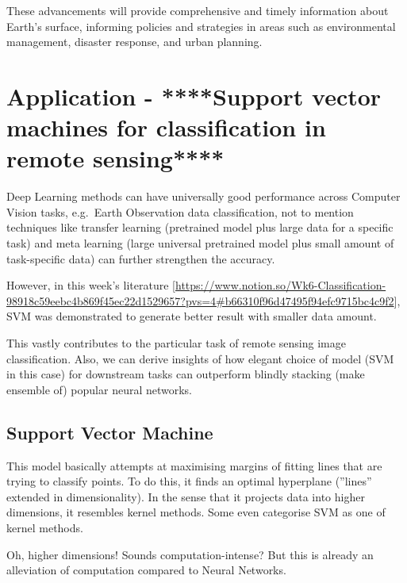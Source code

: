 \documentclass[
  letterpaper,
  DIV=11,
  numbers=noendperiod]{scrreprt}
\begin{document}
These advancements will provide comprehensive and timely information
about Earth's surface, informing policies and strategies in areas such
as environmental management, disaster response, and urban planning.

\hypertarget{application---support-vector-machines-for-classification-in-remote-sensing}{%
\section{Application - ****Support vector machines for classification in
remote
sensing****}\label{application---support-vector-machines-for-classification-in-remote-sensing}}

\href{https://www.tandfonline.com/doi/abs/10.1080/01431160512331314083?journalCode=tres20}{}

Deep Learning methods can have universally good performance across
Computer Vision tasks, e.g.~Earth Observation data classification, not
to mention techniques like transfer learning (pretrained model plus
large data for a specific task) and meta learning (large universal
pretrained model plus small amount of task-specific data) can further
strengthen the accuracy.

However, in this week's literature
{[}\href{https://www.notion.so/Wk6-Classification-98918c59eebc4b869f45ec22d1529657}{https://www.notion.so/Wk6-Classification-98918c59eebc4b869f45ec22d1529657?pvs=4\#b66310f96d47495f94efc9715bc4c9f2}{]},
SVM was demonstrated to generate better result with smaller data amount.

This vastly contributes to the particular task of remote sensing image
classification. Also, we can derive insights of how elegant choice of
model (SVM in this case) for downstream tasks can outperform blindly
stacking (make ensemble of) popular neural networks.

\hypertarget{support-vector-machine}{%
\subsection{Support Vector Machine}\label{support-vector-machine}}

This model basically attempts at maximising margins of fitting lines
that are trying to classify points. To do this, it finds an optimal
hyperplane (''lines'' extended in dimensionality). In the sense that it
projects data into higher dimensions, it resembles kernel methods. Some
even categorise SVM as one of kernel methods.

Oh, higher dimensions! Sounds computation-intense? But this is already
an alleviation of computation compared to Neural Networks.
\end{document}
